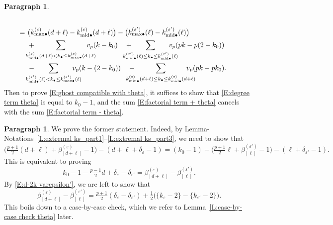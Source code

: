 \documentclass[12pt]{amsart}
\theoremstyle{definition}
\newtheorem{para}[subsection]{Paragraph}
\numberwithin{equation}{subsection}
\newcommand{\midd}{\mathrm{mid}}
\begin{document}
\begin{para}
\begin{align}
\\
\label{E:degree term theta}
=\ &\big( k^{(\varepsilon)}_{{\max}\bullet}(d+\ell) - k^{(\varepsilon)}_{{\midd}\bullet}(d+\ell) \big)- \big( k^{(\varepsilon')}_{{\max}\bullet}(\ell) - k^{(\varepsilon')}_{{\midd}\bullet}(\ell)\big)
\\
\label{E:factorial term + theta}
&+  \hspace{-15pt}\sum_{
k^{(\varepsilon)}_{\midd\bullet}(d+\ell) < k_\bullet \leq k^{(\varepsilon)}_{{\max}\bullet}(d+\ell)}
\hspace{-15pt}v_p(k-k_0)\quad + \hspace{-15pt} \sum_{
k^{(\varepsilon')}_{{\min}\bullet}(\ell) \leq k_\bullet \leq k^{(\varepsilon')}_{{\midd}\bullet}(\ell)}
\hspace{-15pt}v_p(pk-p(2-k_0))\quad 
\\
\label{E:factorial term - theta}
&-  \hspace{-15pt} \sum_{
k^{(\varepsilon')}_{{\midd}\bullet}(\ell) < k_\bullet \leq k^{(\varepsilon')}_{{\max}\bullet}(\ell)}
\hspace{-15pt}v_p(k-(2-k_0))\quad - \hspace{-15pt}\sum_{
k^{(\varepsilon)}_{{\min}\bullet}(d+\ell) \leq k_\bullet \leq k^{(\varepsilon)}_{{\midd}\bullet}(d+\ell)}
\hspace{-15pt}v_p(pk-pk_0).
\end{align}
Then to prove \eqref{E:ghost compatible with theta}, it suffices to show that \eqref{E:degree term theta} is equal to $k_0-1$, and the sum \eqref{E:factorial term + theta} cancels with the sum \eqref{E:factorial term - theta}.
\end{para}

\begin{para}
\label{P:para_144}
We prove the former statement. Indeed, by Lemma-Notations~\ref{L:extremal ks_part1}--\ref{L:extremal ks_part3}, we need to show that
$$
\big(\tfrac{p+1}2 (d+\ell) + \beta_{[d+\ell]}^{(\varepsilon)}-1\big) - (d+\ell + \delta_\varepsilon -1)  = (k_0-1) + \big(\tfrac{p+1}2 \ell + \beta_{[\ell]}^{(\varepsilon')}-1\big) - (\ell + \delta_{\varepsilon'} -1).
$$
This is equivalent to proving
\begin{equation}
k_0-1-\tfrac{p-1}2 d +\delta_\varepsilon - \delta_{\varepsilon'} = \beta_{[d+\ell]}^{(\varepsilon)} - \beta_{[\ell]}^{(\varepsilon')}.
\end{equation}
By \eqref{E:d-2k varepsilon'}, we are left to show that
$$
\beta_{[d+\ell]}^{(\varepsilon)} - \beta_{[\ell]}^{(\varepsilon')} = \tfrac{p+1}2( \delta_\varepsilon -\delta_{\varepsilon'}) +\tfrac 12\big( \{k _\varepsilon -2\} - \{k_{\varepsilon '}-2\}\big).
$$
This boils down to a case-by-case check, which we refer to Lemma~\ref{L:case-by-case check theta} later.
\end{para}
\end{document}
